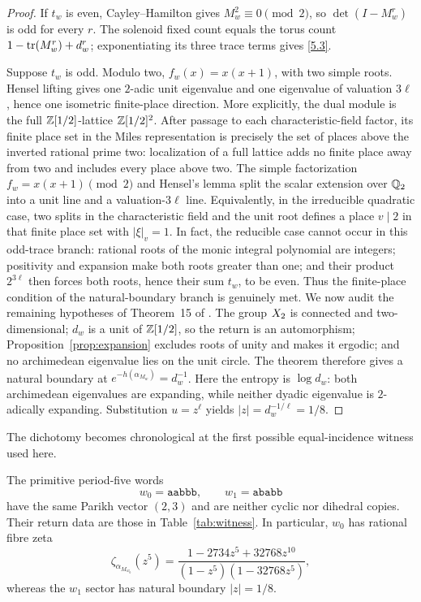\begin{proof}
If \(t_w\) is even, Cayley--Hamilton gives \(M_w^2\equiv0\pmod2\), so
\(\det(I-M_w^r)\) is odd for every \(r\).  The solenoid fixed count equals
the torus count \(1-\operatorname{tr}(M_w^r)+d_w^r\); exponentiating its three trace terms
gives \eqref{5.3}.

Suppose \(t_w\) is odd.  Modulo two, \(f_w(x)=x(x+1)\), with two simple
roots.  Hensel lifting gives one \(2\)-adic unit eigenvalue and one eigenvalue
of valuation \(3\ell\), hence one isometric finite-place direction.  More
explicitly, the dual module is the full \(\mathbb{Z}[1/2]\)-lattice
\(\mathbb{Z}[1/2]^2\).  After passage to each characteristic-field factor, its
finite place set in the Miles representation is precisely the set of places
above the inverted rational prime two: localization of a full lattice adds
no finite place away from two and includes every place above two.  The simple
factorization \(f_w=x(x+1)\pmod2\) and Hensel's lemma split the scalar
extension over \(\mathbb{Q}_2\) into a unit line and a valuation-\(3\ell\) line.
Equivalently, in the irreducible quadratic case, two splits in the
characteristic field and the unit root defines a place \(v\mid2\) in that
finite place set with \(|\xi|_v=1\).  In fact, the reducible case cannot occur
in this odd-trace branch: rational roots of the monic integral polynomial are
integers; positivity and expansion make both roots greater than one; and their
product \(2^{3\ell}\) then forces both roots, hence their sum \(t_w\), to be
even.  Thus the finite-place condition of the natural-boundary branch is
genuinely met.  We now audit the remaining
hypotheses of Theorem~15 of \citet{BellMilesWard2014}.  The group
\(X_2\) is connected and two-dimensional; \(d_w\) is a unit of
\(\mathbb{Z}[1/2]\), so the return is an automorphism; Proposition~\ref{prop:expansion}
excludes roots of unity and makes it ergodic; and no archimedean eigenvalue
lies on the unit circle.  The theorem therefore gives a natural boundary at
\(e^{-h(\alpha_{M_w})}=d_w^{-1}\).  Here the entropy is \(\log d_w\): both
archimedean eigenvalues are expanding, while neither dyadic eigenvalue is
\(2\)-adically expanding.  Substitution \(u=z^\ell\) yields
\(|z|=d_w^{-1/\ell}=1/8\).
\end{proof}

The dichotomy becomes chronological at the first possible equal-incidence
witness used here.

\begin{theorem}
\label{thm:witness}
The primitive period-five words
\[
 w_0=\texttt{aabbb},\qquad w_1=\texttt{ababb}
\]
have the same Parikh vector \((2,3)\) and are neither cyclic nor dihedral
copies.  Their return data are those in Table~\ref{tab:witness}.  In
particular, \(w_0\) has rational fibre zeta
\[
 \zeta_{\alpha_{M_{w_0}}}(z^5)
 =\frac{1-2734z^5+32768z^{10}}
 {(1-z^5)(1-32768z^5)},
 \tag{5.4}\label{5.4}
\]
whereas the \(w_1\) sector has natural boundary \(|z|=1/8\).
\end{theorem}

